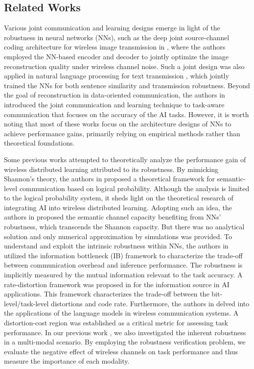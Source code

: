 \documentclass[lettersize,journal]{IEEEtran}
\theoremstyle{definition}
\theoremstyle{plain}
\begin{document}
\subsection{Related Works}
Various joint communication and learning designs emerge in light of the robustness in neural networks (NNs), such as the deep joint source-channel coding architecture for wireless image transmission in \cite{JSCC-image}, where the authors employed the NN-based encoder and decoder to jointly optimize the image reconstruction quality under wireless channel noise. Such a joint design was also applied in natural language processing for text transmission \cite{JSCC-text}, which jointly trained the NNs for both sentence similarity and transmission robustness. Beyond the goal of reconstruction in data-oriented communication, the authors in \cite{IB} introduced the joint communication and learning technique to task-aware communication that focuses on the accuracy of the AI tasks.
However, it is worth noting that most of these works focus on the architecture designs of NNs to achieve performance gains, primarily relying on empirical methods rather than theoretical foundations. 


Some previous works attempted to theoretically analyze the performance gain of wireless distributed learning attributed to its robustness. 
By mimicking Shannon's theory, the authors in \cite{towards-semantic-theory} proposed a theoretical framework for semantic-level communication based on logical probability.
Although the analysis is limited to the logical probability system, it sheds light on the theoretical research of integrating AI into wireless distributed learning.
Adopting such an idea, the authors in \cite{semantic-capacity} proposed the semantic channel capacity benefiting from NNs' robustness, which transcends the Shannon capacity. But there was no analytical solution and only numerical approximation by simulations was provided.
To understand and exploit the intrinsic robustness within NNs, the authors in \cite{IB} utilized the information bottleneck (IB) framework to characterize the trade-off between communication overhead and inference performance. The robustness is implicitly measured by the mutual information relevant to the task accuracy.
A rate-distortion framework was proposed in \cite{RDT} for the information source in AI applications. This framework characterizes the trade-off between the bit-level/task-level distortions and code rate.
Furthermore, the authors in \cite{semantic_theory_Deniz} delved into the applications of the language models in wireless communication systems. A distortion-cost region was established as a critical metric for assessing task performance. 
In our previous work \cite{multi-modal-robustness}, we also investigated the inherent robustness in a multi-modal scenario. By employing the robustness verification problem, we evaluate the negative effect of wireless channels on task performance and thus measure the importance of each modality.
\end{document}
